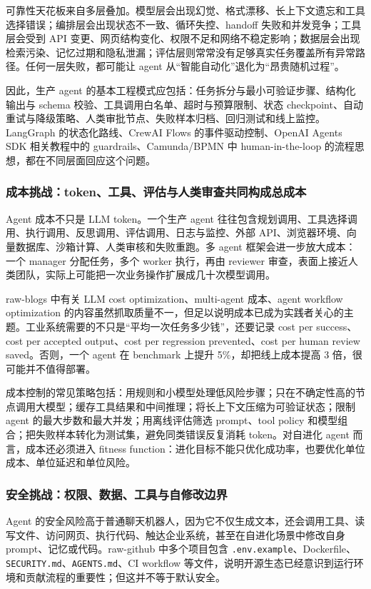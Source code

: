 可靠性天花板来自多层叠加。模型层会出现幻觉、格式漂移、长上下文遗忘和工具选择错误；编排层会出现状态不一致、循环失控、handoff 失败和并发竞争；工具层会受到 API 变更、网页结构变化、权限不足和网络不稳定影响；数据层会出现检索污染、记忆过期和隐私泄漏；评估层则常常没有足够真实任务覆盖所有异常路径。任何一层失败，都可能让 agent 从``智能自动化''退化为``昂贵随机过程''。

因此，生产 agent 的基本工程模式应包括：任务拆分与最小可验证步骤、结构化输出与 schema 校验、工具调用白名单、超时与预算限制、状态 checkpoint、自动重试与降级策略、人类审批节点、失败样本归档、回归测试和线上监控。LangGraph 的状态化路线、CrewAI Flows 的事件驱动控制、OpenAI Agents SDK 相关教程中的 guardrails、Camunda/BPMN 中 human-in-the-loop 的流程思想，都在不同层面回应这个问题。

\subsubsection{成本挑战：token、工具、评估与人类审查共同构成总成本}

Agent 成本不只是 LLM token。一个生产 agent 往往包含规划调用、工具选择调用、执行调用、反思调用、评估调用、日志与监控、外部 API、浏览器环境、向量数据库、沙箱计算、人类审核和失败重跑。多 agent 框架会进一步放大成本：一个 manager 分配任务，多个 worker 执行，再由 reviewer 审查，表面上接近人类团队，实际上可能把一次业务操作扩展成几十次模型调用。

raw-blogs 中有关 LLM cost optimization、multi-agent 成本、agent workflow optimization 的内容虽然抓取质量不一，但足以说明成本已成为实践者关心的主题。工业系统需要的不只是``平均一次任务多少钱''，还要记录 cost per success、cost per accepted output、cost per regression prevented、cost per human review saved。否则，一个 agent 在 benchmark 上提升 5\%，却把线上成本提高 3 倍，很可能并不值得部署。

成本控制的常见策略包括：用规则和小模型处理低风险步骤；只在不确定性高的节点调用大模型；缓存工具结果和中间推理；将长上下文压缩为可验证状态；限制 agent 的最大步数和最大并发；用离线评估筛选 prompt、tool policy 和模型组合；把失败样本转化为测试集，避免同类错误反复消耗 token。对自进化 agent 而言，成本还必须进入 fitness function：进化目标不能只优化成功率，也要优化单位成本、单位延迟和单位风险。

\subsubsection{安全挑战：权限、数据、工具与自修改边界}

Agent 的安全风险高于普通聊天机器人，因为它不仅生成文本，还会调用工具、读写文件、访问网页、执行代码、触达企业系统，甚至在自进化场景中修改自身 prompt、记忆或代码。raw-github 中多个项目包含 \texttt{.env.example}、Dockerfile、\texttt{SECURITY.md}、\texttt{AGENTS.md}、CI workflow 等文件，说明开源生态已经意识到运行环境和贡献流程的重要性；但这并不等于默认安全。

